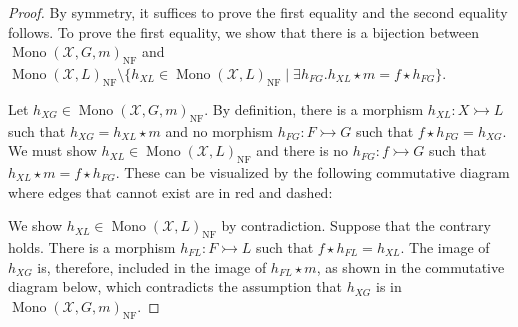 \begin{proof}
    By symmetry, it suffices to prove the first equality and the second equality follows. To prove the first equality, we show that there is a bijection between $\operatorname{Mono}(\mathcal{X},G,m)_{\operatorname{NF}}$ and $\operatorname{Mono}(\mathcal{X},L)_{\operatorname{NF}} \mathop{\setminus} \{
                h_{XL} \mathop{\in} \operatorname{Mono}(\mathcal{X},L)_{\operatorname{NF}} \mid 
                \exists h_{FG}. h_{XL} \mathop{\star} m \mathop{=} f \mathop{\star} h_{FG}
            \}$.

    Let $h_{XG} \mathop{\in} \operatorname{Mono}(\mathcal{X},G,m)_{\operatorname{NF}}$.  By definition, there is a morphism $h_{XL}: X \rightarrowtail L$ such that $h_{XG} \mathop{=} h_{XL} \mathop{\star} m$ and no morphism $h_{FG}: F \rightarrowtail G$ such that $f \mathop{\star} h_{FG} \mathop{=} h_{XG}$. We must show $h_{XL} \mathop{\in} \operatorname{Mono}(\mathcal{X},L)_{\operatorname{NF}}$ and there is no $h_{FG}:f \rightarrowtail G$ such that $h_{XL} \mathop{\star} m \mathop{=} f \mathop{\star} h_{FG}$. These can be visualized by the following commutative diagram where edges that cannot exist are in red and dashed:

    \begin{center}
    \end{center}
    
    We show $h_{XL} \mathop{\in} \operatorname{Mono}(\mathcal{X},L)_{\operatorname{NF}}$ by contradiction. Suppose that the contrary holds. There is a morphism $h_{FL}: F \rightarrowtail L$ such that $f \mathop{\star} h_{FL} \mathop{=} h_{XL}$.
    The image of $h_{XG}$ is, therefore, included in the image of $h_{FL} \mathop{\star} m$, as shown in the commutative diagram below, which contradicts the assumption that $h_{XG}$ is in $\operatorname{Mono}(\mathcal{X},G,m)_{\operatorname{NF}}$. 


\end{proof}
